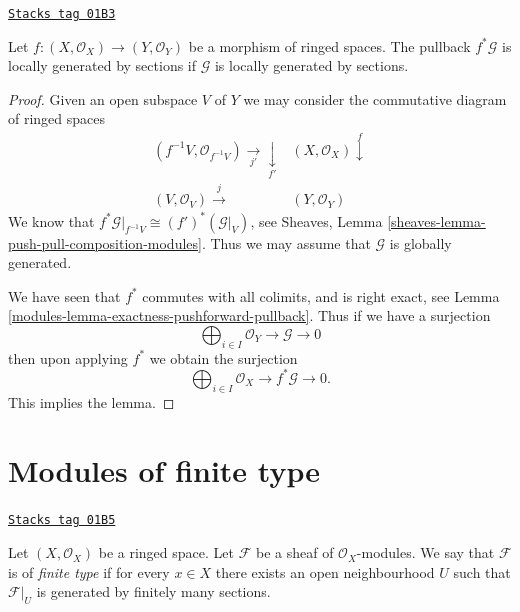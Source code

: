 \begin{lemma}
\label{modules-lemma-pullback-locally-generated}
\href{https://stacks.math.columbia.edu/tag/01B3}{\texttt{Stacks tag 01B3}}

Let $f : (X, \mathcal{O}_X) \to (Y, \mathcal{O}_Y)$
be a morphism of ringed spaces.
The pullback $f^*\mathcal{G}$ is locally generated by sections
if $\mathcal{G}$ is locally generated by sections.
\end{lemma}

\begin{proof}

Given an open subspace $V$ of $Y$ we may
consider the commutative diagram of ringed spaces
$$
\begin{array}{cc}(f^{-1}V, \mathcal{O}_{f^{-1}V}) \underset{j'}{\longrightarrow}\underset{f'}{\downarrow} & (X, \mathcal{O}_X) \overset{f}{\downarrow} \\ (V, \mathcal{O}_V) \overset{j}{\longrightarrow} & (Y, \mathcal{O}_Y)\end{array}
$$
We know that $f^*\mathcal{G}|_{f^{-1}V} \cong (f')^*(\mathcal{G}|_V)$,
see Sheaves, Lemma \ref{sheaves-lemma-push-pull-composition-modules}.
Thus we may assume that $\mathcal{G}$ is globally generated.

\medskip\noindent
We have seen that $f^*$ commutes with all colimits,
and is right exact, see Lemma \ref{modules-lemma-exactness-pushforward-pullback}.
Thus if we have a surjection
$$
\bigoplus\nolimits_{i \in I}
\mathcal{O}_Y
\to
\mathcal{G}
\to
0
$$
then upon applying $f^*$ we obtain the surjection
$$
\bigoplus\nolimits_{i \in I}
\mathcal{O}_X
\to
f^*\mathcal{G}
\to
0.
$$
This implies the lemma.
\end{proof}

\section{Modules of finite type}
\label{modules-section-finite-type}
\begin{definition}
\label{modules-definition-finite-type}
\href{https://stacks.math.columbia.edu/tag/01B5}{\texttt{Stacks tag 01B5}}

Let $(X, \mathcal{O}_X)$ be a ringed space.
Let $\mathcal{F}$ be a sheaf of $\mathcal{O}_X$-modules.
We say that $\mathcal{F}$ is of {\it finite type}
if for every $x \in X$ there exists an open
neighbourhood $U$ such that $\mathcal{F}|_U$
is generated by finitely many sections.
\end{definition}

